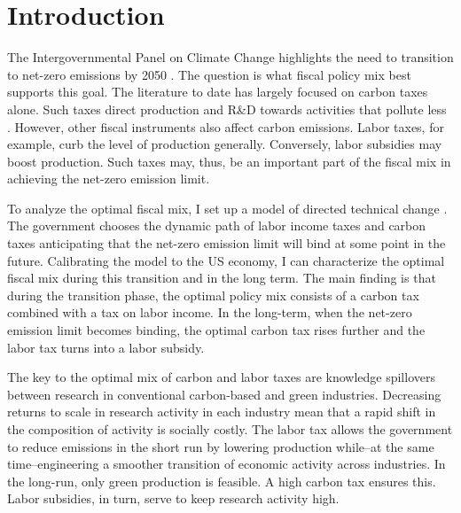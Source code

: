 \clearpage
\section{Introduction}




The Intergovernmental Panel on Climate Change highlights the need to transition to net-zero emissions by 2050 \citep{IPCC2022}. The question is what fiscal policy mix best supports this goal. The literature to date has largely focused on carbon taxes alone. Such taxes direct production and R\&D towards activities that pollute less \citep{Acemoglu2012TheChange}. However, other fiscal instruments also affect carbon emissions. Labor taxes, for example, curb the level of production generally. Conversely, labor subsidies may boost production. Such taxes may, thus, be an important part of the fiscal mix in achieving the  net-zero emission limit. 

To analyze the optimal fiscal mix, I set up a model of directed technical change \citep{Acemoglu2002DirectedChange, Acemoglu2012TheChange}. The government chooses the dynamic path of labor income taxes and carbon taxes anticipating that the net-zero emission limit will bind at some point in the future. Calibrating the model to the US economy, I can characterize the optimal fiscal mix during this transition and in the long term. The main finding is that during the transition phase, the optimal policy mix consists of a carbon tax  combined with a tax on labor income. In the long-term, when the net-zero emission limit becomes binding, the optimal carbon tax rises further and the labor tax turns into a labor subsidy. 

The key to the optimal mix of carbon and labor taxes are knowledge spillovers between research in conventional carbon-based and green industries. Decreasing returns to scale in research activity in each industry mean that a rapid shift in the composition of activity is socially costly. The labor tax allows the government to reduce emissions in the short run by  lowering production while–at the same time–engineering a smoother transition of economic activity across industries. In the long-run, only green production is feasible. A high carbon tax ensures this. Labor subsidies, in turn, serve to keep research activity high.

